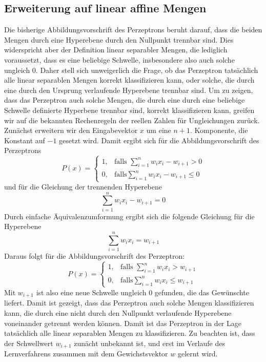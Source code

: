 \documentclass[a4paper]{scrartcl}
\begin{document}
\begin{multicols}{2}
            \subsection{Erweiterung auf linear affine Mengen}
                Die bisherige Abbildungsvorschrift des Perzeptrons beruht darauf, dass die beiden Mengen durch eine Hyperebene durch den Nullpunkt trennbar sind. Dies widerspricht aber der Definition linear separabler Mengen, die lediglich voraussetzt, dass es eine beliebige Schwelle, insbesondere also auch solche ungleich $0$. Daher stell sich unweigerlich die Frage, ob das Perzeptron tatsächlich alle linear separablen Mengen korrekt klassifizieren kann, oder solche, die durch eine durch den Ursprung verlaufende Hyperebene trennbar sind. Um zu zeigen, dass das Perzeptron auch solche Mengen, die durch eine durch eine beliebige Schwelle definierte Hyperbene trennbar sind, korrekt klassifizieren kann, greifen wir auf die bekannten Rechenregeln der reellen Zahlen für Ungleichungen zurück.
                Zunächst erweitern wir den Eingabevektor $x$ um eine $n+1$. Komponente, die Konstant auf $-1$ gesetzt wird.
                \newline 
                Damit ergibt sich für die Abbildungsvorschrift des Perzeptrons 
                $$
                    P(x)=\left\{\begin{array}{cl} 1, & \mbox{falls }\sum_{i=1}^nw_ix_i - w_{i+1} > 0\\ 0, & \mbox{falls} \sum_{i=1}^n w_ix_i - w_{i+1} \leq 0 \end{array}\right. 
                $$
                und für die Gleichung der trennenden Hyperebene
                $$
                    \sum_{i=1}^nw_ix_i - w_{i+1} = 0
                $$
                Durch einfache Äquivalenzumformung ergibt sich die folgende Gleichung für die Hyperebene
                    $$
                        \sum_{i=1}^nw_ix_i = w_{i+1}
                    $$
                    Daraus folgt für die Abbildungsvorschrift des Perzeptron:
                    $$
                    P(x)=\left\{\begin{array}{cl} 1, & \mbox{falls }\sum_{i=1}^nw_ix_i > w_{i+1}\\ 0, & \mbox{falls} \sum_{i=1}^n w_ix_i \leq w_{i+1} \end{array}\right. 
                    $$
                    Mit $w_{i+1}$ ist also eine neue Schwelle ungleich $0$ gefunden, die das Gewünschte liefert. Damit ist gezeigt, dass das Perzeptron auch solche Mengen klassifizieren kann, die durch eine nicht durch den Nullpunkt verlaufende Hyperebene voneinander getrennt werden können. Damit ist das Perzeptron in der Lage tatsächlich alle linear separablen Mengen zu klassifizieren.
                    \newline
                    Zu beachten ist, dass der Schwellwert $w_{i+1}$ zunächt unbekannt ist, und erst im Verlaufe des Lernverfahrens zusammen mit dem Gewichstsvektor $w$ gelernt wird.

\end{multicols}
\end{document}
